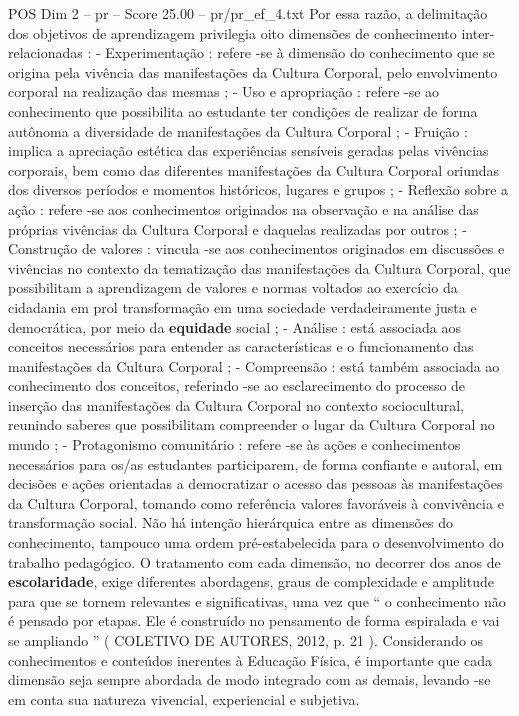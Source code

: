 \begin{textsample}{POS Dim 2 – pr – Score 25.00 – pr/pr\_ef\_4.txt}
Por essa razão, a delimitação dos objetivos de aprendizagem privilegia oito dimensões de conhecimento inter-relacionadas : - Experimentação : refere -se à dimensão do conhecimento que se origina pela vivência das manifestações da Cultura Corporal, pelo envolvimento corporal na realização das mesmas ; - Uso e apropriação : refere -se ao conhecimento que possibilita ao estudante ter condições de realizar de forma autônoma a diversidade de manifestações da Cultura Corporal ; - Fruição : implica a apreciação estética das experiências sensíveis geradas pelas vivências corporais, bem como das diferentes manifestações da Cultura Corporal oriundas dos diversos períodos e momentos históricos, lugares e grupos ; - Reflexão sobre a ação : refere -se aos conhecimentos originados na observação e na análise das próprias vivências da Cultura Corporal e daquelas realizadas por outros ; - Construção de valores : vincula -se aos conhecimentos originados em discussões e vivências no contexto da tematização das manifestações da Cultura Corporal, que possibilitam a aprendizagem de valores e normas voltados ao exercício da cidadania em prol transformação em uma sociedade verdadeiramente justa e democrática, por meio da \textbf{equidade} social ; - Análise : está associada aos conceitos necessários para entender as características e o funcionamento das manifestações da Cultura Corporal ; - Compreensão : está também associada ao conhecimento dos conceitos, referindo -se ao esclarecimento do processo de inserção das manifestações da Cultura Corporal no contexto sociocultural, reunindo saberes que possibilitam compreender o lugar da Cultura Corporal no mundo ; - Protagonismo comunitário : refere -se às ações e conhecimentos necessários para os/as estudantes participarem, de forma confiante e autoral, em decisões e ações orientadas a democratizar o acesso das pessoas às manifestações da Cultura Corporal, tomando como referência valores favoráveis à convivência e transformação social.
Não há intenção hierárquica entre as dimensões do conhecimento, tampouco uma ordem pré-estabelecida para o desenvolvimento do trabalho pedagógico.
O tratamento com cada dimensão, no decorrer dos anos de \textbf{escolaridade}, exige diferentes abordagens, graus de complexidade e amplitude para que se tornem relevantes e significativas, uma vez que “ o conhecimento não é pensado por etapas.
Ele é construído no pensamento de forma espiralada e vai se ampliando ” ( COLETIVO DE AUTORES, 2012, p. 21 ).
Considerando os conhecimentos e conteúdos inerentes à Educação Física, é importante que cada dimensão seja sempre abordada de modo integrado com as demais, levando -se em conta sua natureza vivencial, experiencial e subjetiva.

\end{textsample}

